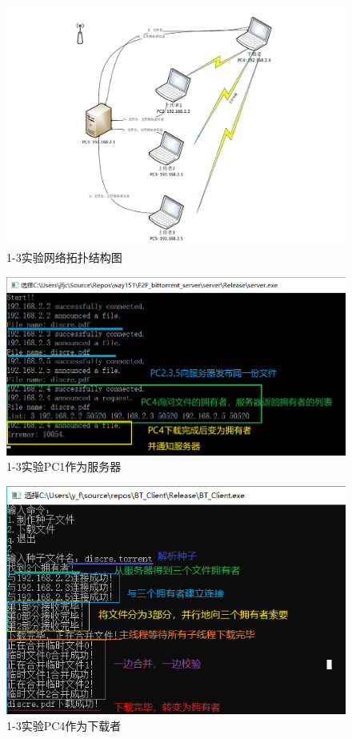 \documentclass[thesis]{thesis}
\begin{document}
	\begin{figure}[H]
		\centering
		\includegraphics[width=0.8\linewidth]{fig/3-1.pdf}
		\caption{1-3实验\quad 网络拓扑结构图}
		\label{res:13}
	\end{figure}
	\begin{minipage}{0.5\linewidth}
	\begin{figure}[H]
		\centering
		\includegraphics[width=\linewidth]{fig/PC1_31.png}
		\caption{1-3实验\quad PC1作为服务器}
		\label{res:PC1_31}
	\end{figure}
	\end{minipage}
	\begin{minipage}{0.5\linewidth}
	\begin{figure}[H]
		\centering
		\includegraphics[width=\linewidth]{fig/PC4_31.png}
		\caption{1-3实验\quad PC4作为下载者}
		\label{res:PC4_31}
	\end{figure}
	\end{minipage}
\end{document}
